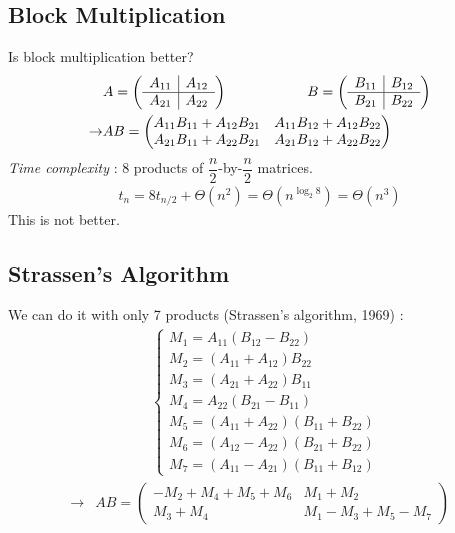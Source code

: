 \subsection{Block Multiplication}
Is block multiplication better?
\begin{align*}
&A=\left(\begin{array}{c|c}
A_{11} & A_{12}\\
\hline
A_{21} & A_{22}
\end{array}\right) \hspace*{2cm} B=\left(\begin{array}{c|c}
B_{11} & B_{12}\\
\hline
B_{21} & B_{22}
\end{array}\right)\\
\rightarrow &AB=\begin{pmatrix}
A_{11}B_{11}+A_{12}B_{21} & A_{11}B_{12}+A_{12}B_{22}\\
A_{21}B_{11}+A_{22}B_{21} & A_{21}B_{12}+A_{22}B_{22}
\end{pmatrix}
\end{align*}
\emph{Time complexity} : 8 products of $\dfrac{n}{2}$-by-$\dfrac{n}{2}$ matrices.
\begin{align*}
t_n=8t_{n/2}+\Theta(n^2)=\Theta\left(n^{\log_2 8}\right)=\Theta\left(n^3\right)
\end{align*}
This is not better. 

\subsection{Strassen's Algorithm}
We can do it with only 7 products (Strassen's algorithm, 1969) : 
\begin{align*}
&\left\{
\begin{array}{l}
M_1=A_{11}(B_{12}-B_{22})\\
M_2=(A_{11} + A_{12}) B_{22}\\
M_3=(A_{21} + A_{22}) B_{11}\\
M_4=A_{22} (B_{21} - B_{11})\\
M_5=(A_{11} + A_{22})(B_{11} +B_{22})\\
M_6=(A_{12} - A_{22})(B_{21} +B_{22})\\
M_7=(A_{11} - A_{21})(B_{11}+B_{12})
\end{array}
\right.
\end{align*}
\begin{align*}
\rightarrow & AB=\begin{pmatrix}
-M_2+M_4+M_5+M_6 & M_1+M_2\\
M_3+M_4 & M_1-M_3+M_5-M_7
\end{pmatrix}
\end{align*}

